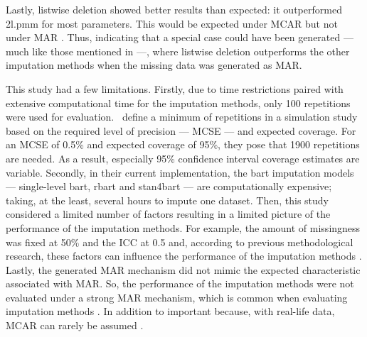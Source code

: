 \documentclass[3p,12pt,a4paper]{elsarticle}
\begin{document}
Lastly, listwise deletion showed better results than expected: it outperformed 2l.pmm for most parameters. This would be expected under MCAR but not under MAR \citep{buurenFlexibleImputationMissing2018,enders2018a,peeters2015,austin2021,carpenter2013,little2002,grund2018,ludtke2017,grund2021,schouten2021}. Thus, indicating that a special case could have been generated --- much like those mentioned in \citep[§2.7]{buurenFlexibleImputationMissing2018} ---, where listwise deletion outperforms the other imputation methods when the missing data was generated as MAR.

This study had a few limitations. Firstly, due to time restrictions paired with extensive computational time for the imputation methods, only 100 repetitions were used for evaluation.~\citet{morris2019} define a minimum of repetitions in a simulation study based on the required level of precision --- MCSE --- and expected coverage. For an MCSE of 0.5\% and expected coverage of 95\%, they pose that 1900 repetitions are needed. As a result, especially 95\% confidence interval coverage estimates are variable. Secondly, in their current implementation, the bart imputation models --- single-level bart, rbart and stan4bart --- are computationally expensive; taking, at the least, several hours to impute one dataset. Then, this study considered a limited number of factors resulting in a limited picture of the performance of the imputation methods. For example, the amount of missingness was fixed at 50\% and the ICC at 0.5 and, according to previous methodological research, these factors can influence the performance of the imputation methods \citep{enders2018,enders2018a,enders2020,mistler2017,akkayahocagil2023,grund2016,grund2018a,grund2018,ludtke2017,grund2021}. Lastly, the generated MAR mechanism did not mimic the expected characteristic associated with MAR. So, the performance of the imputation methods were not evaluated under a strong MAR mechanism, which is common when evaluating imputation methods \citep{buurenFlexibleImputationMissing2018,enders2018a,peeters2015,austin2021,carpenter2013,little2002,grund2018,ludtke2017,grund2021,schouten2021}. In addition to important because, with real-life data, MCAR can rarely be assumed \citep{oberman2023,buurenFlexibleImputationMissing2018,kang2013,little2002}.
\end{document}
